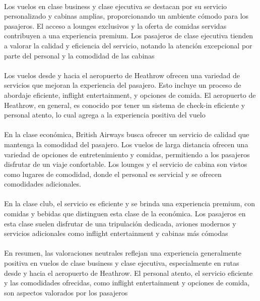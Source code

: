 \documentclass{report}
\begin{document}
                    \paragraph*{}{
                        Los vuelos en clase business y clase ejecutiva se destacan por su servicio personalizado y cabinas amplias, proporcionando un ambiente cómodo para los pasajeros. El acceso a lounges exclusivos y la oferta de comidas servidas contribuyen a una experiencia premium. Los pasajeros de clase ejecutiva tienden a valorar la calidad y eficiencia del servicio, notando la atención excepcional por parte del personal y la comodidad de las cabinas
                    }
                    \paragraph*{}{
                        Los vuelos desde y hacia el aeropuerto de Heathrow ofrecen una variedad de servicios que mejoran la experiencia del pasajero. Esto incluye un proceso de abordaje eficiente, inflight entertainment, y opciones de comida. El aeropuerto de Heathrow, en general, es conocido por tener un sistema de check-in eficiente y personal atento, lo cual agrega a la experiencia positiva del vuelo
                    }
                    \paragraph*{}{
                        En la clase económica, British Airways busca ofrecer un servicio de calidad que mantenga la comodidad del pasajero. Los vuelos de larga distancia ofrecen una variedad de opciones de entretenimiento y comidas, permitiendo a los pasajeros disfrutar de un viaje confortable. Los lounges y el servicio de cabina son vistos como lugares de comodidad, donde el personal es servicial y se ofrecen comodidades adicionales.
                    }
                    \paragraph*{}{
                        En la clase club, el servicio es eficiente y se brinda una experiencia premium, con comidas y bebidas que distinguen esta clase de la económica. Los pasajeros en esta clase suelen disfrutar de una tripulación dedicada, aviones modernos y servicios adicionales como inflight entertainment y cabinas más cómodas
                    }
                    \paragraph*{}{
                        En resumen, las valoraciones neutrales reflejan una experiencia generalmente positiva en vuelos de clase business y clase ejecutiva, especialmente en rutas desde y hacia el aeropuerto de Heathrow. El personal atento, el servicio eficiente y las comodidades ofrecidas, como inflight entertainment y opciones de comida, son aspectos valorados por los pasajeros
                    }
\end{document}

